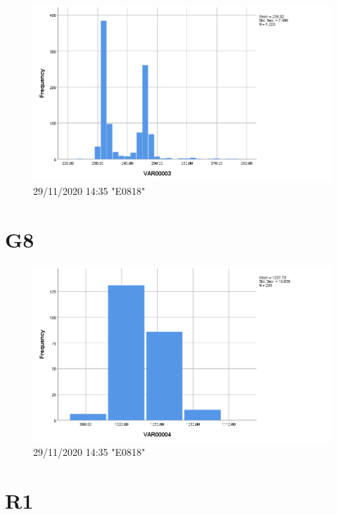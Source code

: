 \documentclass[hidelinks, 12pt, a4paper]{article}
\begin{document}
\begin{figure}[h!]
	\centering
		\includegraphics[height=.38\textheight, width=\textwidth]{assets/session2/g7.png}
	\caption{29/11/2020 14:35 "E0818"} 
	\end{figure}

\section{G8}

\begin{figure}[h!]
	\centering
		\includegraphics[height=.38\textheight, width=\textwidth]{assets/session2/g8.png}
	\caption{29/11/2020 14:35 "E0818"} 
	\end{figure}

\section{R1}
\end{document}
